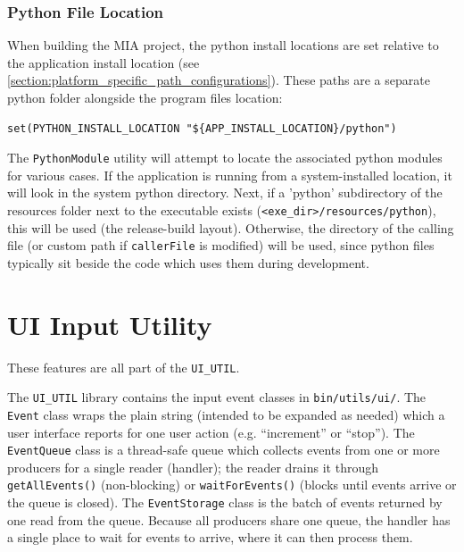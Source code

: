\subsubsection{Python File Location}\label{section:python_file_location}

When building the MIA project, the python install locations are set relative to the application install location (see \ref{section:platform_specific_path_configurations}). These paths are a separate python folder alongside the program files location:
\begin{lstlisting}[style=makestyle]
set(PYTHON_INSTALL_LOCATION "${APP_INSTALL_LOCATION}/python")
\end{lstlisting}
The \texttt{PythonModule} utility will attempt to locate the associated python modules for various cases. If the application is running from a system-installed location, it will look in the system python directory. Next, if a 'python' subdirectory of the resources folder next to the executable exists (\texttt{<exe\_dir>/resources/python}), this will be used (the release-build layout). Otherwise, the directory of the calling file (or custom path if \texttt{callerFile} is modified) will be used, since python files typically sit beside the code which uses them during development.







\section{UI Input Utility}\label{section:ui_utils}

These features are all part of the \texttt{UI\_UTIL}.

The \texttt{UI\_UTIL} library contains the input event classes in \texttt{bin/utils/ui/}. The \texttt{Event} class wraps the plain string (intended to be expanded as needed) which a user interface reports for one user action (e.g. ``increment'' or ``stop''). The \texttt{EventQueue} class is a thread-safe queue which collects events from one or more producers for a single reader (handler); the reader drains it through \texttt{getAllEvents()} (non-blocking) or \texttt{waitForEvents()} (blocks until events arrive or the queue is closed). The \texttt{EventStorage} class is the batch of events returned by one read from the queue. Because all producers share one queue, the handler has a single place to wait for events to arrive, where it can then process them.


